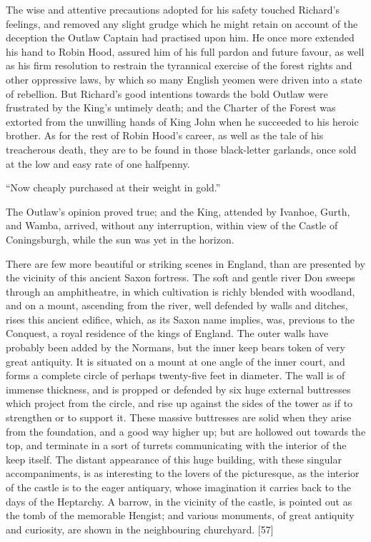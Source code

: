 The wise and attentive precautions adopted for his safety touched
Richard's feelings, and removed any slight grudge which he might retain
on account of the deception the Outlaw Captain had practised upon him.
He once more extended his hand to Robin Hood, assured him of his full
pardon and future favour, as well as his firm resolution to restrain the
tyrannical exercise of the forest rights and other oppressive laws, by
which so many English yeomen were driven into a state of rebellion. But
Richard's good intentions towards the bold Outlaw were frustrated by the
King's untimely death; and the Charter of the Forest was extorted from
the unwilling hands of King John when he succeeded to his heroic
brother. As for the rest of Robin Hood's career, as well as the tale of
his treacherous death, they are to be found in those black-letter
garlands, once sold at the low and easy rate of one halfpenny.

``Now cheaply purchased at their weight in gold.''

The Outlaw's opinion proved true; and the King, attended by Ivanhoe,
Gurth, and Wamba, arrived, without any interruption, within view of the
Castle of Coningsburgh, while the sun was yet in the horizon.

There are few more beautiful or striking scenes in England, than are
presented by the vicinity of this ancient Saxon fortress. The soft and
gentle river Don sweeps through an amphitheatre, in which cultivation is
richly blended with woodland, and on a mount, ascending from the river,
well defended by walls and ditches, rises this ancient edifice, which,
as its Saxon name implies, was, previous to the Conquest, a royal
residence of the kings of England. The outer walls have probably been
added by the Normans, but the inner keep bears token of very great
antiquity. It is situated on a mount at one angle of the inner court,
and forms a complete circle of perhaps twenty-five feet in diameter. The
wall is of immense thickness, and is propped or defended by six huge
external buttresses which project from the circle, and rise up against
the sides of the tower as if to strengthen or to support it. These
massive buttresses are solid when they arise from the foundation, and a
good way higher up; but are hollowed out towards the top, and terminate
in a sort of turrets communicating with the interior of the keep itself.
The distant appearance of this huge building, with these singular
accompaniments, is as interesting to the lovers of the picturesque, as
the interior of the castle is to the eager antiquary, whose imagination
it carries back to the days of the Heptarchy. A barrow, in the vicinity
of the castle, is pointed out as the tomb of the memorable Hengist; and
various monuments, of great antiquity and curiosity, are shown in the
neighbouring churchyard. {[}57{]}

